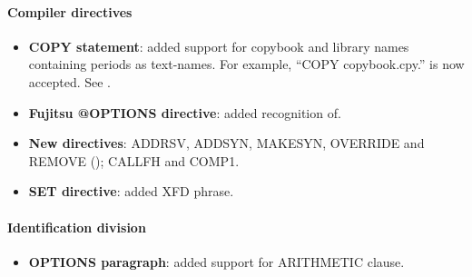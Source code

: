 \paragraph{Compiler directives}
\begin{itemize}
\item \textbf{COPY statement}: added support for copybook and library names containing periods as text-names. For example,  ``COPY copybook.cpy.'' is now accepted. See .
\item \textbf{Fujitsu @OPTIONS directive}: added recognition of.
\item \textbf{New directives}: ADDRSV, ADDSYN, MAKESYN, OVERRIDE and REMOVE (); CALLFH and COMP1.
\item \textbf{SET directive}: added XFD phrase.
\end{itemize}

\paragraph{Identification division}
\begin{itemize}
\item \textbf{OPTIONS paragraph}: added support for ARITHMETIC clause.
\end{itemize}


